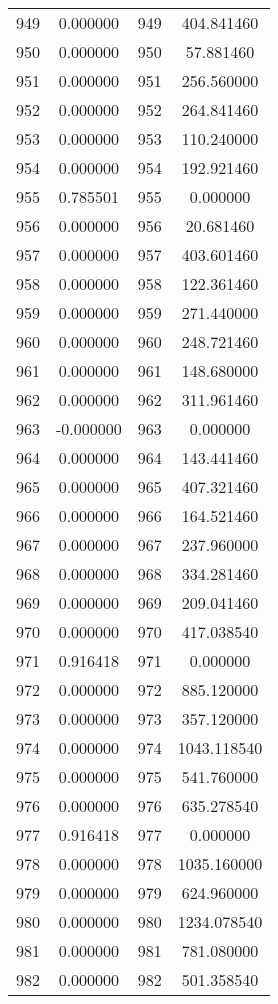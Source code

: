 \documentclass[12pt]{article}
\begin{document}
\begin{longtable}{@{}cccc@{}}
949 & 0.000000 & 949 & 404.841460 \\
950 & 0.000000 & 950 & 57.881460 \\
951 & 0.000000 & 951 & 256.560000 \\
952 & 0.000000 & 952 & 264.841460 \\
953 & 0.000000 & 953 & 110.240000 \\
954 & 0.000000 & 954 & 192.921460 \\
955 & 0.785501 & 955 & 0.000000 \\
956 & 0.000000 & 956 & 20.681460 \\
957 & 0.000000 & 957 & 403.601460 \\
958 & 0.000000 & 958 & 122.361460 \\
959 & 0.000000 & 959 & 271.440000 \\
960 & 0.000000 & 960 & 248.721460 \\
961 & 0.000000 & 961 & 148.680000 \\
962 & 0.000000 & 962 & 311.961460 \\
963 & -0.000000 & 963 & 0.000000 \\
964 & 0.000000 & 964 & 143.441460 \\
965 & 0.000000 & 965 & 407.321460 \\
966 & 0.000000 & 966 & 164.521460 \\
967 & 0.000000 & 967 & 237.960000 \\
968 & 0.000000 & 968 & 334.281460 \\
969 & 0.000000 & 969 & 209.041460 \\
970 & 0.000000 & 970 & 417.038540 \\
971 & 0.916418 & 971 & 0.000000 \\
972 & 0.000000 & 972 & 885.120000 \\
973 & 0.000000 & 973 & 357.120000 \\
974 & 0.000000 & 974 & 1043.118540 \\
975 & 0.000000 & 975 & 541.760000 \\
976 & 0.000000 & 976 & 635.278540 \\
977 & 0.916418 & 977 & 0.000000 \\
978 & 0.000000 & 978 & 1035.160000 \\
979 & 0.000000 & 979 & 624.960000 \\
980 & 0.000000 & 980 & 1234.078540 \\
981 & 0.000000 & 981 & 781.080000 \\
982 & 0.000000 & 982 & 501.358540 \\

\end{longtable}
\end{document}
